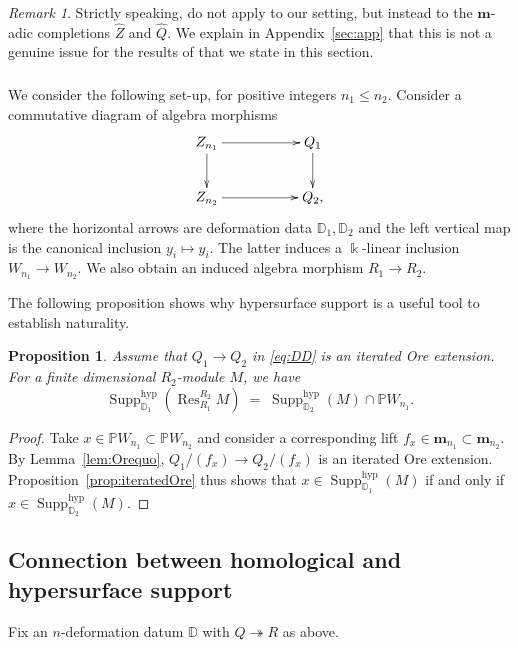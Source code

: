 \documentclass{amsart}
\numberwithin{equation}{section}
\newtheorem{proposition}[subsubsection]{Proposition}
\theoremstyle{definition}
\theoremstyle{remark}
\newtheorem{remark}[subsubsection]{Remark}
\newcommand{\bk}{\Bbbk}
\newcommand{\Res}{\operatorname{Res}}
\newcommand{\hyp}{\mathrm{hyp}}
\newcommand{\tto}{\twoheadrightarrow}
\newcommand{\Supp}{\operatorname{Supp}}
\newcommand{\fm}{\mathbf{m}}
\newcommand{\mD}{\mathbb{D}}
\newcommand{\mP}{\mathbb{P}}
\begin{document}
\begin{remark}
Strictly speaking, \cite{NP1,NP2} do not apply to our setting, but instead to the $\fm$-adic completions $\widehat{Z}$ and $\widehat{Q}$. We explain in Appendix~\ref{sec:app} that this is not a genuine issue for the results of \cite{NP1, NP2} that we state in this section.
\end{remark}


\subsubsection{}\label{sec:DD}
We consider the following set-up, for positive integers $n_1\le n_2$. Consider a commutative diagram of algebra morphisms
\begin{equation}\label{eq:DD}\xymatrix{
Z_{n_1}\ar[rr]\ar[d]&& Q_1\ar[d]\\
Z_{n_2}\ar[rr]&& Q_2,
}\end{equation}
where the horizontal arrows are deformation data $\mD_1,\mD_2$ and the left vertical map is the canonical inclusion $y_i\mapsto y_i$. The latter induces a $\bk$-linear inclusion $W_{n_1}\to W_{n_2}$. We also obtain an induced algebra morphism $R_1\to R_2$.


The following proposition shows why hypersurface support is a useful tool to establish naturality.
\begin{proposition}\label{prop:iteratedOre2} Assume that $Q_1\to Q_2$ in \eqref{eq:DD} is an iterated Ore extension.
For a finite dimensional $R_2$-module $M$, we have
\[\Supp^{\hyp}_{\mD_1}(\Res^{R_2}_{R_1} M)\;=\;\Supp^{\hyp}_{\mD_2}(M)\cap \mP W_{n_1}.\]
\end{proposition}
\begin{proof}
Take $x\in \mP W_{n_1}\subset\mP W_{n_2}$ and consider a corresponding lift $f_x\in \fm_{n_1}\subset\fm_{n_2}$. By Lemma~\ref{lem:Orequo}, $Q_1/(f_x)\to Q_2/(f_x)$ is an iterated Ore extension. Proposition~\ref{prop:iteratedOre} thus shows that $x\in \Supp_{\mD_1}^{\hyp}(M)$ if and only if $x\in \Supp_{\mD_2}^{\hyp}(M)$.
\end{proof}

\subsection{Connection between homological and hypersurface support}

Fix an $n$-deformation datum $\mD$ with $Q\tto R$ as above. 
\end{document}
